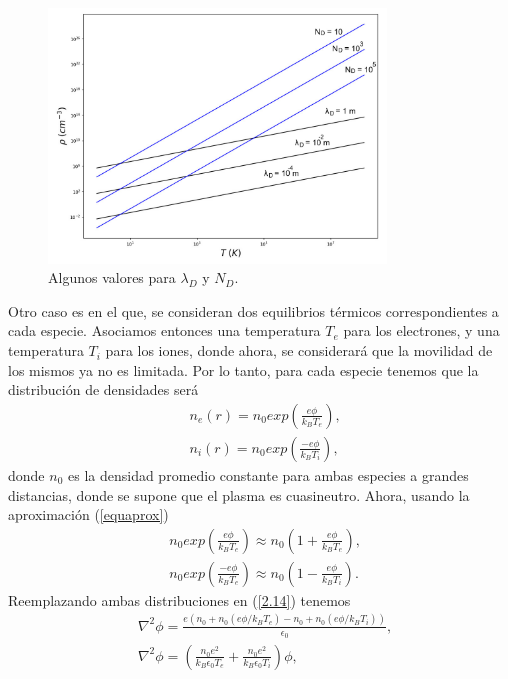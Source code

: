 \documentclass[../main.tex]{subfiles}
\begin{document}
 \begin{figure}[h]
        \centering
        \includegraphics[width=0.8\textwidth]{Images/long_part.jpg}
        \caption{Algunos valores para $\lambda_D$ y $N_D$.}
    \end{figure}
    Otro caso es en el que, se consideran dos equilibrios térmicos correspondientes a cada especie.
    Asociamos entonces una temperatura $T_e$ para los electrones, y una temperatura $T_i$ para los iones, donde ahora, se considerará que la movilidad de los mismos ya no es limitada. Por lo tanto, para cada especie tenemos que la distribución de densidades será
        \begin{align}
            &n_e(r) = n_0exp\left(\frac{e\phi}{k_BT_e}\right), \\
            &n_i(r) = n_0exp\left(\frac{-e\phi}{k_BT_i}\right),
        \end{align}
    donde $n_0$ es la densidad promedio constante para ambas especies a grandes distancias, donde se supone que el plasma es cuasineutro. Ahora, usando la aproximación (\ref{equaprox}) 
        \begin{align}
             &n_0exp\left(\frac{e\phi}{k_BT_e}\right) \approx n_0\left(1+\frac{e\phi}{k_BT_e}\right), \\
             &n_0exp\left(\frac{-e\phi}{k_BT_e}\right) \approx n_0\left(1-\frac{e\phi}{k_BT_i}\right).
        \end{align}
    Reemplazando ambas distribuciones en (\ref{2.14}) tenemos
        \begin{align}
            &\nabla^2\phi = \frac{e(n_0+n_0(e\phi/k_BT_e)-n_0+n_0(e\phi/k_BT_i))}{\epsilon_0}, \\
            &\nabla^2\phi = \left(\frac{n_0e^2}{k_B\epsilon_0T_e} + \frac{n_0e^2}{k_B\epsilon_0T_i}\right)\phi,
        \end{align}
\end{document}
